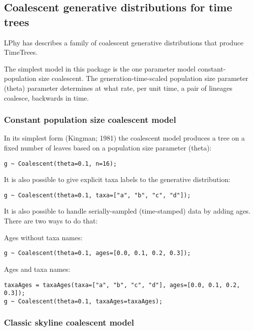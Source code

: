 \documentclass[oneside]{article}
\begin{document}
\subsection{Coalescent generative distributions for time trees}

LPhy has describes a family of coalescent generative distributions
that produce TimeTrees.

The simplest model in this package is the one parameter model
constant-population size coalescent.
The generation-time-scaled population size parameter (theta) parameter determines at
what rate, per unit time, a pair of lineages coalesce, backwards in time.

\subsubsection{Constant population size coalescent model}

In its simplest form (Kingman; 1981) the coalescent model produces a
tree on a fixed number of leaves based on a population size parameter (theta):

\begin{verbatim}
g ~ Coalescent(theta=0.1, n=16);
\end{verbatim}

It is also possible to give explicit taxa labels to the generative
distribution:

\begin{verbatim}
g ~ Coalescent(theta=0.1, taxa=["a", "b", "c", "d"]);
\end{verbatim}

It is also possible to handle serially-sampled (time-stamped) data by
adding ages.
There are two ways to do that:

Ages without taxa names:

\begin{verbatim}
g ~ Coalescent(theta=0.1, ages=[0.0, 0.1, 0.2, 0.3]);
\end{verbatim}

Ages and taxa names:

\begin{verbatim}
taxaAges = taxaAges(taxa=["a", "b", "c", "d"], ages=[0.0, 0.1, 0.2,
0.3]);
g ~ Coalescent(theta=0.1, taxaAges=taxaAges);
\end{verbatim}

\subsubsection{Classic skyline coalescent model}
\end{document}
